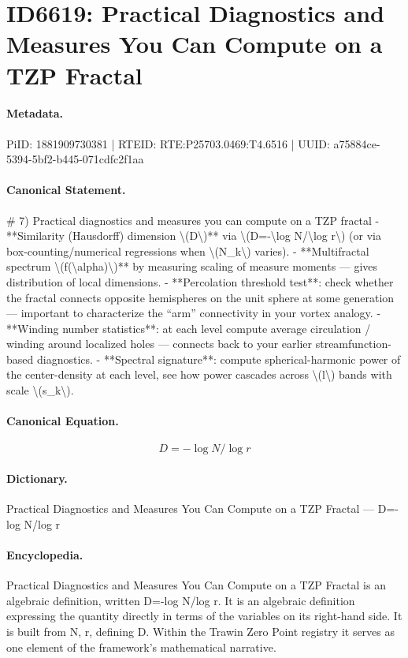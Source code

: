 \section*{ID6619: Practical Diagnostics and Measures You Can Compute on a TZP Fractal}
\paragraph{Metadata.}
PiID: 1881909730381 | RTEID: RTE:P25703.0469:T4.6516 | UUID: a75884ce-5394-5bf2-b445-071cdfc2f1aa

\paragraph{Canonical Statement.}
\# 7) Practical diagnostics and measures you can compute on a TZP fractal - **Similarity (Hausdorff) dimension \textbackslash{}(D\textbackslash{})** via \textbackslash{}(D=-\textbackslash{}log N/\textbackslash{}log r\textbackslash{}) (or via box-counting/numerical regressions when \textbackslash{}(N\_k\textbackslash{}) varies). - **Multifractal spectrum \textbackslash{}(f(\textbackslash{}alpha)\textbackslash{})** by measuring scaling of measure moments — gives distribution of local dimensions. - **Percolation threshold test**: check whether the fractal connects opposite hemispheres on the unit sphere at some generation — important to characterize the “arm” connectivity in your vortex analogy. - **Winding number statistics**: at each level compute average circulation / winding around localized holes — connects back to your earlier streamfunction-based diagnostics. - **Spectral signature**: compute spherical-harmonic power of the center-density at each level, see how power cascades across \textbackslash{}(l\textbackslash{}) bands with scale \textbackslash{}(s\_k\textbackslash{}).

\paragraph{Canonical Equation.}
\[
D=-\log N/\log r
\]

\paragraph{Dictionary.}
Practical Diagnostics and Measures You Can Compute on a TZP Fractal — D=-log N/log r

\paragraph{Encyclopedia.}
Practical Diagnostics and Measures You Can Compute on a TZP Fractal is an algebraic definition, written D=-log N/log r. It is an algebraic definition expressing the quantity directly in terms of the variables on its right-hand side. It is built from N, r, defining D. Within the Trawin Zero Point registry it serves as one element of the framework's mathematical narrative.
